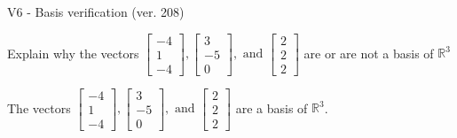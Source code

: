 \begin{exercise}
  \begin{exerciseTitle}V6 - Basis verification (ver. 208)\end{exerciseTitle}
  \begin{exerciseStatement}
    Explain why the vectors \(\left[\begin{array}{r}
-4 \\
1 \\
-4
\end{array}\right] , \left[\begin{array}{r}
3 \\
-5 \\
0
\end{array}\right] , \text{ and } \left[\begin{array}{r}
2 \\
2 \\
2
\end{array}\right]\) are or are not a basis of \(\mathbb{R}^3\)	


  \end{exerciseStatement}
  \begin{exerciseAnswer}
   The vectors \(\left[\begin{array}{r}
-4 \\
1 \\
-4
\end{array}\right] , \left[\begin{array}{r}
3 \\
-5 \\
0
\end{array}\right] , \text{ and } \left[\begin{array}{r}
2 \\
2 \\
2
\end{array}\right]\) 
  	 are  a basis of \(\mathbb{R}^3\).
  


  \end{exerciseAnswer}
\end{exercise}